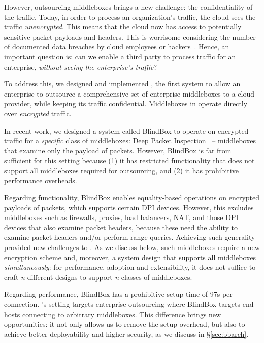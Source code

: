 However, outsourcing middleboxes brings a new challenge: the confidentiality of the traffic. 
Today, in order to process an organization's traffic, the cloud sees the traffic {\em unencrypted}.  This means that the cloud 
now has access to potentially sensitive packet payloads and headers. This is 
worrisome considering the number of documented data breaches by cloud employees or hackers~\cite{PrivacyRecords,databreach}.
Hence, an important question is: can we enable a third party to process traffic for an enterprise, {\em without seeing the enterprise's traffic}?

To address this, we designed and implemented \sys, the first system to allow an enterprise to outsource  a comprehensive set of enterprise middleboxes  to a cloud provider, while keeping its traffic confidential. 
Middleboxes in \sys operate directly over {\it encrypted} traffic. %


In recent work, we designed a system called BlindBox to operate on encrypted traffic for a {\em specific} class of middleboxes: Deep Packet Inspection~\cite{blindbox} -- middleboxes that examine only the payload of packets. 
However, BlindBox is far from sufficient for this setting because
 (1) it has restricted functionality that does not support all middleboxes required for outsourcing, and (2) it has prohibitive performance overheads.
 
 Regarding functionality, BlindBox enables equality-based operations on  encrypted payloads of packets, which supports certain DPI devices. However, this excludes middleboxes such as firewalls, proxies, load balancers, NAT,  and those DPI devices that also examine packet headers, because these need the ability to examine packet headers and/or perform range queries. 
 Achieving such generality provided new challenges to \sys. 
As we discuss below, such middleboxes require a new encryption scheme and, moreover, a system design that supports all middleboxes {\it simultaneously}: for performance, adoption and extensibility, it does not suffice to craft {\it n} different designs to support {\it n} classes of middleboxes. 

 
Regarding performance, BlindBox has a prohibitive setup time of 97s per-connection. 
\sys's setting targets enterprise outsourcing where BlindBox targets end hosts connecting to arbitrary middleboxes. This difference brings \sys new opportunities: it
not only allows us to remove the setup overhead, but also to achieve better deployability and higher security, as we discuss in \S\ref{sec:bbarch}. 

